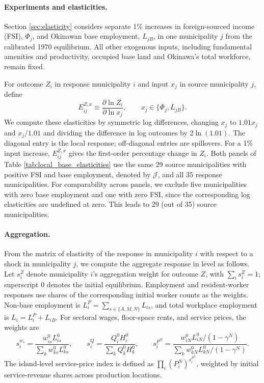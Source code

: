 \documentclass[12pt, unicode, a4paper]{article}
\newcommand{\1}{\mbox{1}\hspace{-0.25em}\mbox{l}} %
\begin{document}
\paragraph{Experiments and elasticities.}
Section \ref{sec:elasticity} considers separate 1\% increases in foreign-sourced income (FSI), $\Phi_j$, and Okinawan base employment, $L_{jB}$, in one municipality $j$ from the calibrated 1970 equilibrium. All other exogenous inputs, including fundamental amenities and productivity, occupied base land and Okinawa's total workforce, remain fixed.

For outcome $Z_i$ in response municipality $i$ and input $x_j$ in source municipality $j$, define
\begin{equation}
\label{eq:local_base_elasticities}
    E_{ij}^{Z,x}\equiv\frac{\partial\ln Z_i}{\partial\ln x_j},
    \qquad x_j\in\{\Phi_j,L_{jB}\}.
\end{equation}
We compute these elasticities by symmetric log differences, changing $x_j$ to $1.01x_j$ and $x_j/1.01$ and dividing the difference in log outcomes by $2\ln(1.01)$. The diagonal entry is the local response; off-diagonal entries are spillovers. For a 1\% input increase, $E_{ij}^{Z,x}$ gives the first-order percentage change in $Z_i$. Both panels of Table \ref{tab:local_base_elasticities} use the same 29 source municipalities with positive FSI and base employment, denoted by $\mathcal J$, and all 35 response municipalities. For comparability across panels, we exclude five municipalities with zero base employment and one with zero FSI, since the corresponding log elasticities are undefined at zero. This leads to 29 (out of 35) source municipalities.

\paragraph{Aggregation.}
From the matrix of elasticity of the response in municipality $i$ with respect to a shock in municipality $j$, we compute the aggregate response in level as follows.
Let $s_i^Z$ denote municipality $i$'s aggregation weight for outcome $Z$, with $\sum_i s_i^Z=1$; superscript $0$ denotes the initial equilibrium. Employment and resident-worker responses use shares of the corresponding initial worker counts as the weights. Non-base employment is $L_i^P=\sum_{s\in\{A,M,N\}}L_{is}$, and total workplace employment is $L_i=L_i^P+L_{iB}$. For sectoral wages, floor-space rents, and service prices, the weights are
\begin{equation*}
    s_i^{w_s}=\frac{w_{is}^0L_{is}^0}{\sum_k w_{ks}^0L_{ks}^0},
    \qquad
    s_i^Q=\frac{Q_i^0H_i^0}{\sum_k Q_k^0H_k^0},
    \qquad
    s_i^{P^N}=\frac{w_{iN}^0L_{iN}^0/(1-\gamma^N)}{\sum_k w_{kN}^0L_{kN}^0/(1-\gamma^N)}.
\end{equation*}
The island-level service-price index is defined as $\prod_i(P_i^N)^{s_i^{P^N}}$, weighted by initial service-revenue shares across production locations.
\end{document}
